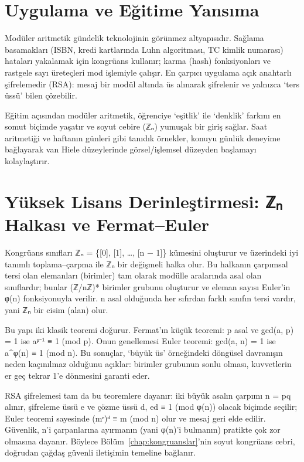 \section{Uygulama ve Eğitime Yansıma}

Modüler aritmetik gündelik teknolojinin görünmez altyapısıdır. Sağlama basamakları (ISBN, kredi kartlarında Luhn algoritması, TC kimlik numarası) hataları yakalamak için kongrüans kullanır; karma (hash) fonksiyonları ve rastgele sayı üreteçleri mod işlemiyle çalışır. En çarpıcı uygulama açık anahtarlı şifrelemedir (RSA): mesaj bir modül altında üs alınarak şifrelenir ve yalnızca ‘ters üssü’ bilen çözebilir.

Eğitim açısından modüler aritmetik, öğrenciye ‘eşitlik’ ile ‘denklik’ farkını en somut biçimde yaşatır ve soyut cebire (ℤₙ) yumuşak bir giriş sağlar. Saat aritmetiği ve haftanın günleri gibi tanıdık örnekler, konuyu günlük deneyime bağlayarak van Hiele düzeylerinde görsel/işlemsel düzeyden başlamayı kolaylaştırır.

\section{Yüksek Lisans Derinleştirmesi: ℤₙ Halkası ve Fermat–Euler}

Kongrüans sınıfları ℤₙ = \{[0], [1], …, [n − 1]\} kümesini oluşturur ve üzerindeki iyi tanımlı toplama–çarpma ile ℤₙ bir değişmeli halka olur. Bu halkanın çarpımsal tersi olan elemanları (birimler) tam olarak modülle aralarında asal olan sınıflardır; bunlar (ℤ/nℤ)* birimler grubunu oluşturur ve eleman sayısı Euler’in φ(n) fonksiyonuyla verilir. n asal olduğunda her sıfırdan farklı sınıfın tersi vardır, yani ℤₙ bir cisim (alan) olur.

Bu yapı iki klasik teoremi doğurur. Fermat’ın küçük teoremi: p asal ve gcd(a, p) = 1 ise aᵖ⁻¹ ≡ 1 (mod p). Onun genellemesi Euler teoremi: gcd(a, n) = 1 ise a\textasciicircum{}φ(n) ≡ 1 (mod n). Bu sonuçlar, ‘büyük üs’ örneğindeki döngüsel davranışın neden kaçınılmaz olduğunu açıklar: birimler grubunun sonlu olması, kuvvetlerin er geç tekrar 1’e dönmesini garanti eder.

RSA şifrelemesi tam da bu teoremlere dayanır: iki büyük asalın çarpımı n = pq alınır, şifreleme üssü e ve çözme üssü d, ed ≡ 1 (mod φ(n)) olacak biçimde seçilir; Euler teoremi sayesinde (mᵉ)ᵈ ≡ m (mod n) olur ve mesaj geri elde edilir. Güvenlik, n’i çarpanlarına ayırmanın (yani φ(n)’i bulmanın) pratikte çok zor olmasına dayanır. Böylece Bölüm~\ref{chap:kongruanslar}’nin soyut kongrüans cebri, doğrudan çağdaş güvenli iletişimin temeline bağlanır.

